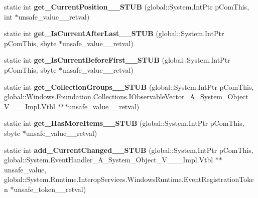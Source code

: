 \begin{DoxyCompactItemize}
static int {\bfseries get\+\_\+\+Current\+Position\+\_\+\+\_\+\+S\+T\+UB} (global\+::\+System.\+Int\+Ptr p\+Com\+This, int $\ast$unsafe\+\_\+value\+\_\+\+\_\+retval)
\item 
\mbox{\label{struct_windows_1_1_u_i_1_1_xaml_1_1_data_1_1_i_collection_view_____impl_1_1_vtbl_a5dfdf621c1cce5486a1833879acc6785}} 
static int {\bfseries get\+\_\+\+Is\+Current\+After\+Last\+\_\+\+\_\+\+S\+T\+UB} (global\+::\+System.\+Int\+Ptr p\+Com\+This, sbyte $\ast$unsafe\+\_\+value\+\_\+\+\_\+retval)
\item 
\mbox{\label{struct_windows_1_1_u_i_1_1_xaml_1_1_data_1_1_i_collection_view_____impl_1_1_vtbl_aec02e603fdba0583cfcf5bc039d82490}} 
static int {\bfseries get\+\_\+\+Is\+Current\+Before\+First\+\_\+\+\_\+\+S\+T\+UB} (global\+::\+System.\+Int\+Ptr p\+Com\+This, sbyte $\ast$unsafe\+\_\+value\+\_\+\+\_\+retval)
\item 
\mbox{\label{struct_windows_1_1_u_i_1_1_xaml_1_1_data_1_1_i_collection_view_____impl_1_1_vtbl_a0c0e03b6849e9f9c499aa5e1c79c40c2}} 
static int {\bfseries get\+\_\+\+Collection\+Groups\+\_\+\+\_\+\+S\+T\+UB} (global\+::\+System.\+Int\+Ptr p\+Com\+This, global\+::\+Windows.\+Foundation.\+Collections.\+I\+Observable\+Vector\+\_\+\+A\+\_\+\+System\+\_\+\+Object\+\_\+\+V\+\_\+\+\_\+\+\_\+\+Impl.\+Vtbl $\ast$$\ast$$\ast$unsafe\+\_\+value\+\_\+\+\_\+retval)
\item 
\mbox{\label{struct_windows_1_1_u_i_1_1_xaml_1_1_data_1_1_i_collection_view_____impl_1_1_vtbl_a4d0a63b9203787ac905f828cba617214}} 
static int {\bfseries get\+\_\+\+Has\+More\+Items\+\_\+\+\_\+\+S\+T\+UB} (global\+::\+System.\+Int\+Ptr p\+Com\+This, sbyte $\ast$unsafe\+\_\+value\+\_\+\+\_\+retval)
\item 
\mbox{\label{struct_windows_1_1_u_i_1_1_xaml_1_1_data_1_1_i_collection_view_____impl_1_1_vtbl_a538d10f0291c1aa83780c1bb92ed092b}} 
static int {\bfseries add\+\_\+\+Current\+Changed\+\_\+\+\_\+\+S\+T\+UB} (global\+::\+System.\+Int\+Ptr p\+Com\+This, global\+::\+System.\+Event\+Handler\+\_\+\+A\+\_\+\+System\+\_\+\+Object\+\_\+\+V\+\_\+\+\_\+\+\_\+\+Impl.\+Vtbl $\ast$$\ast$unsafe\+\_\+value, global\+::\+System.\+Runtime.\+Interop\+Services.\+Windows\+Runtime.\+Event\+Registration\+Token $\ast$unsafe\+\_\+token\+\_\+\+\_\+retval)
$$
\end{DoxyCompactItemize}
